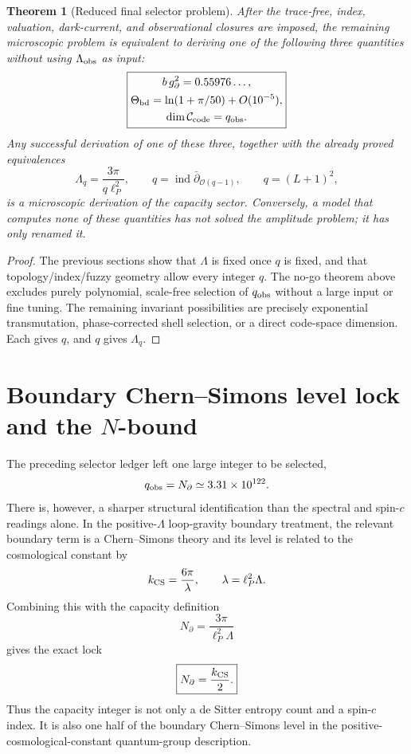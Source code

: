 \documentclass[aps,prd,reprint,nofootinbib,superscriptaddress,floatfix]{revtex4-2}
\numberwithin{equation}{section}
\theoremstyle{definition}
\theoremstyle{plain}
\newtheorem{theorem}{Theorem}[section]
\begin{document}
\begin{theorem}[Reduced final selector problem]
After the trace-free, index, valuation, dark-current, and observational
closures are imposed, the remaining microscopic problem is equivalent
to deriving one of the following three quantities without using
\(\Lambda_{\rm obs}\) as input:
\begin{equation}
\boxed{
\begin{gathered}
b\,g_\partial^2=0.55976\ldots,\\
\Theta_{\rm bd}=\ln(1+\pi/50)+O(10^{-5}),\\
\dim\mathcal C_{\rm code}=q_{\rm obs}.
\end{gathered}}
\end{equation}
Any successful derivation of one of these three, together with the
already proved equivalences
\[
\Lambda_q=\frac{3\pi}{q\ell_P^2},
\qquad
q=\operatorname{ind}\bar\partial_{\mathcal O(q-1)},
\qquad
q=(L+1)^2,
\]
is a microscopic derivation of the capacity sector.  Conversely, a
model that computes none of these quantities has not solved the
amplitude problem; it has only renamed it.
\end{theorem}

\begin{proof}
The previous sections show that \(\Lambda\) is fixed once \(q\) is
fixed, and that topology/index/fuzzy geometry allow every integer
\(q\).  The no-go theorem above excludes purely polynomial, scale-free
selection of \(q_{\rm obs}\) without a large input or fine tuning.  The
remaining invariant possibilities are precisely exponential
transmutation, phase-corrected shell selection, or a direct code-space
dimension.  Each gives \(q\), and \(q\) gives \(\Lambda_q\).
\end{proof}



\section{\texorpdfstring{Boundary Chern--Simons level lock and the \(N\)-bound}{Boundary Chern--Simons level lock and the N-bound}}

The preceding selector ledger left one large integer to be selected,
\[
q_{\rm obs}=N_\partial\simeq 3.31\times10^{122}.
\]
There is, however, a sharper structural identification than the
spectral and spin-\(c\) readings alone.  In the positive-\(\Lambda\)
loop-gravity boundary treatment, the relevant boundary term is a
Chern--Simons theory and its level is related to the cosmological
constant by \cite{Smolin2002}
\begin{equation}
k_{\rm CS}=\frac{6\pi}{\lambda},
\qquad
\lambda=\ell_P^2\Lambda .
\end{equation}
Combining this with the capacity definition
\[
N_\partial=\frac{3\pi}{\ell_P^2\Lambda}
\]
gives the exact lock
\begin{equation}
\boxed{
N_\partial=\frac{k_{\rm CS}}{2}.
}
\label{eq:cs-level-lock}
\end{equation}
Thus the capacity integer is not only a de Sitter entropy count and a
spin-\(c\) index.  It is also one half of the boundary Chern--Simons
level in the positive-cosmological-constant quantum-group description.
\end{document}
